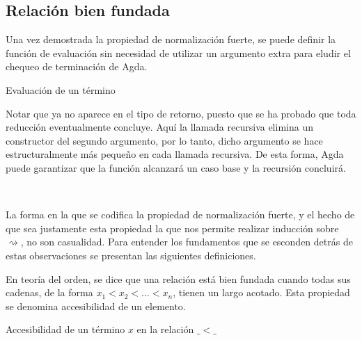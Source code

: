 


\subsection{Relación bien fundada}

Una vez demostrada la propiedad de normalización fuerte, se puede definir la función de evaluación sin necesidad de utilizar un argumento extra para eludir el chequeo de terminación de Agda.
  
\begin{codigo}
	Evaluación de un término
\end{codigo}

Notar que ya no aparece  en el tipo de retorno, puesto que se ha probado que toda reducción eventualmente concluye.
Aquí la llamada recursiva elimina un constructor  del segundo argumento, por lo tanto, dicho argumento se hace estructuralmente más pequeño en cada llamada recursiva.
De esta forma, Agda puede garantizar que la función alcanzará un caso base y la recursión concluirá.

\begin{example}
	~\newline
\end{example}

La forma en la que se codifica la propiedad de normalización fuerte, y el hecho de que sea justamente esta propiedad la que nos permite realizar inducción sobre $\rightsquigarrow$, no son casualidad.
Para entender los fundamentos que se esconden detrás de estas observaciones se presentan las siguientes definiciones.

En teoría del orden, se dice que una relación está bien fundada cuando todas sus cadenas, de la forma $x_1 < x_2 < \dots < x_n$, tienen un largo acotado.
Esta propiedad se denomina accesibilidad de un elemento.

\begin{codigo}
	Accesibilidad de un término $x$ en la relación $\_<\_$
\end{codigo}

